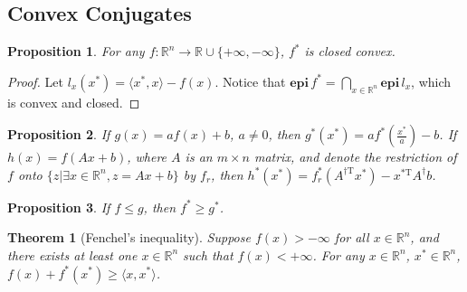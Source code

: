 \documentclass[openany]{book}
\newtheorem{proposition}{Proposition}[chapter]
\newtheorem{theorem}{Theorem}[chapter]
\theoremstyle{definition}
\theoremstyle{remark}
\begin{document}
\subsection{Convex Conjugates}
\begin{proposition}
    For any $f:\mathbb{R}^n\to \mathbb{R}\cup\{+\infty,-\infty\}$, $f^*$ is closed convex.
\end{proposition}
\begin{proof}
    Let $l_x(x^*)=\langle x^*,x\rangle-f(x)$. Notice that $\mathbf{epi}\,f^*=\bigcap_{x\in \mathbb{R}^n}\mathbf{epi}\,l_x$, which is convex and closed.
\end{proof}
\begin{proposition}
    If $g(x)=af(x)+b$, $a\ne0$, then $g^*(x^*)=af^*(\frac{x^*}{a})-b$. If $h(x)=f(Ax+b)$, where $A$ is an $m\times n$ matrix, and denote the restriction of $f$ onto $\{z|\exists x\in \mathbb{R}^n,z=Ax+b\}$ by $f_r$, then $h^*(x^*)=f_r^*(A^{\dagger \mathrm{T}}x^*)-x^{*\mathrm{T}}A^{\dagger}b$.
\end{proposition}
\begin{proposition}
    If $f\le g$, then $f^*\ge g^*$.
\end{proposition}
\begin{theorem}[Fenchel's inequality]
    Suppose $f(x)>-\infty$ for all $x\in \mathbb{R}^n$, and there exists at least one $x\in \mathbb{R}^n$ such that $f(x)<+\infty$. For any $x\in \mathbb{R}^n$, $x^*\in \mathbb{R}^n$, $f(x)+f^*(x^*)\ge \langle x,x^*\rangle$.
\end{theorem}
\end{document}
